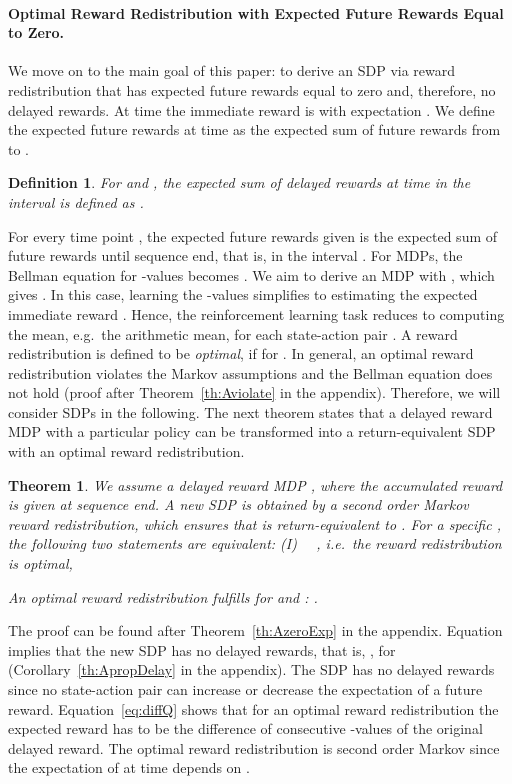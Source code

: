 \documentclass{article}
\newtheorem{theorem}{Theorem}
\newtheorem{definition}{Definition}
\begin{document}
\paragraph{Optimal Reward Redistribution with 
           Expected Future Rewards Equal to Zero.}
We move on to the main goal of this paper: 
to derive an SDP via reward redistribution 
that has expected future rewards equal to zero and, therefore,
no delayed rewards.
At time  the immediate reward is  with expectation
.
We define the expected future rewards  at time 
as the expected sum of future rewards from  to .
\begin{definition}
For  and ,  
the expected sum of delayed rewards at time  
in the interval  is defined as
.
\end{definition}
For every time point , the expected future rewards  
given 
is the expected sum of future rewards until sequence end, 
that is, in the interval . 
For MDPs, the Bellman equation for -values becomes
.
We aim to derive an MDP with ,
which gives .
In this case, learning the -values 
simplifies to estimating the expected immediate reward
.
Hence, the reinforcement learning task reduces to computing 
the mean, e.g.\ the arithmetic mean, for each
state-action pair .
A reward redistribution is defined to be {\em optimal},  
if  for .
In general, an optimal reward redistribution violates
the Markov assumptions and the Bellman equation does
not hold (proof after Theorem~\ref{th:Aviolate} in the appendix).
Therefore, we will consider SDPs in the following.
The next theorem states that 
a delayed reward MDP  
with a particular policy 
can be transformed into a return-equivalent SDP 
with an optimal reward redistribution.
\begin{theorem}
\label{th:zeroExp}
We assume a delayed reward MDP , 
where the accumulated reward is given at sequence end.
A new SDP  is obtained by a 
second order Markov reward redistribution,
which ensures that  is return-equivalent to .
For a specific , the following two
statements are equivalent:
(I) ~~, i.e.\ the reward redistribution is optimal, 

An optimal reward redistribution
fulfills for  and :
  . 
\end{theorem}
The proof can be found after Theorem~\ref{th:AzeroExp} in the appendix.
Equation  implies that the new SDP 
has no delayed rewards, that is, 
,
for  
(Corollary~\ref{th:ApropDelay} in the appendix).
The SDP  has no delayed rewards since no state-action pair
can increase or decrease the expectation of a future reward.
Equation~\eqref{eq:diffQ} shows that for an optimal reward redistribution
the expected reward has to be the difference of
consecutive -values of the original delayed reward.
The optimal reward redistribution is
second order Markov since the expectation of  at time 
 depends on .
\end{document}

